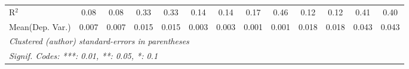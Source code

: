 \begin{tabular}{lcccccccccccc}
   R$^2$                                    & 0.08          & 0.08            & 0.33         & 0.33     & 0.14            & 0.14           & 0.17    & 0.46           & 0.12          & 0.12            & 0.41    & 0.40\\  
Mean(Dep. Var.) & 0.007 & 0.007 & 0.015 & 0.015 & 0.003 & 0.003 & 0.001 & 0.001 & 0.018 & 0.018 & 0.043 & 0.043 \\
   \midrule \midrule
   \multicolumn{13}{l}{\emph{Clustered (author) standard-errors in parentheses}}\\
   \multicolumn{13}{l}{\emph{Signif. Codes: ***: 0.01, **: 0.05, *: 0.1}}\\
\end{tabular}
\par\endgroup
